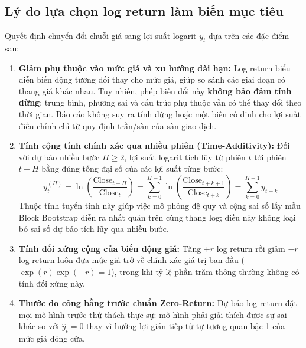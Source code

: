 \documentclass[12pt,a4paper]{report}
\begin{document}
\subsection{Lý do lựa chọn log return làm biến mục tiêu}
Quyết định chuyển đổi chuỗi giá sang lợi suất logarit $y_t$ dựa trên các đặc điểm sau:
\begin{enumerate}
    \item \textbf{Giảm phụ thuộc vào mức giá và xu hướng dài hạn:} Log return biểu diễn biến động tương đối thay cho mức giá, giúp so sánh các giai đoạn có thang giá khác nhau. Tuy nhiên, phép biến đổi này \textbf{không bảo đảm tính dừng}: trung bình, phương sai và cấu trúc phụ thuộc vẫn có thể thay đổi theo thời gian. Báo cáo không suy ra tính dừng hoặc một biên cố định cho lợi suất điều chỉnh chỉ từ quy định trần/sàn của sàn giao dịch.
    \item \textbf{Tính cộng tính chính xác qua nhiều phiên (Time-Additivity):} Đối với dự báo nhiều bước $H \ge 2$, lợi suất logarit tích lũy từ phiên $t$ tới phiên $t+H$ bằng đúng tổng đại số của các lợi suất từng bước:
    \begin{equation}
        y_t^{(H)} = \ln\left(\frac{\text{Close}_{t+H}}{\text{Close}_t}\right) = \sum_{k=0}^{H-1} \ln\left(\frac{\text{Close}_{t+k+1}}{\text{Close}_{t+k}}\right) = \sum_{k=0}^{H-1} y_{t+k}
    \end{equation}
    Thuộc tính tuyến tính này giúp việc mô phỏng đệ quy và cộng sai số lấy mẫu Block Bootstrap diễn ra nhất quán trên cùng thang log; điều này không loại bỏ sai số dự báo tích lũy qua nhiều bước.
    \item \textbf{Tính đối xứng cộng của biến động giá:} Tăng $+r$ log return rồi giảm $-r$ log return luôn đưa mức giá trở về chính xác giá trị ban đầu ($\exp(r)\exp(-r) = 1$), trong khi tỷ lệ phần trăm thông thường không có tính đối xứng này.
    \item \textbf{Thước đo công bằng trước chuẩn Zero-Return:} Dự báo log return đặt mọi mô hình trước thử thách thực sự: mô hình phải giải thích được sự sai khác so với $\hat{y}_t = 0$ thay vì hưởng lợi gián tiếp từ tự tương quan bậc 1 của mức giá đóng cửa.
\end{enumerate}
\end{document}

